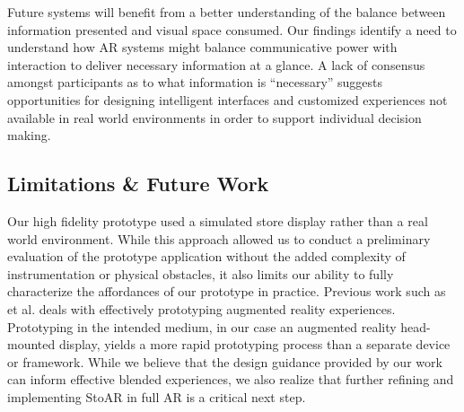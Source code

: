 Future systems will benefit from a better understanding of the balance between information presented and visual space consumed. Our findings identify a need to understand how AR systems might balance communicative power with interaction to deliver necessary information at a glance. A lack of consensus amongst participants as to what information is ``necessary'' suggests opportunities for designing intelligent interfaces and customized experiences not available in real world environments in order to support individual decision making. 

\subsection{Limitations \& Future Work}
Our high fidelity prototype used a simulated store display rather than a real world environment.  While this approach allowed us to conduct a preliminary evaluation of the prototype application without the added complexity of instrumentation or physical obstacles, it also limits our ability to fully characterize the affordances of our prototype in practice. Previous work such as et al. \cite{macintyre2004dart} deals with effectively prototyping augmented reality experiences. Prototyping in the intended medium, in our case an augmented reality head-mounted display, yields a more rapid prototyping process than a separate device or framework.
While we believe that the design guidance provided by our work can inform effective blended experiences, we also realize that further refining and implementing StoAR in full AR is a critical next step. 

